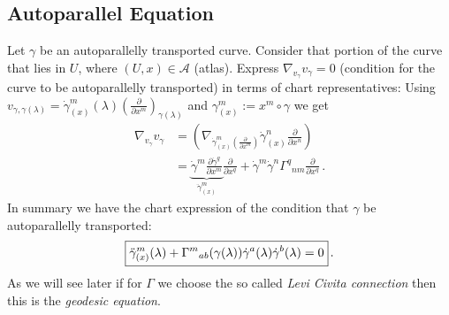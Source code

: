 \documentclass[11pt, a4paper, twocolumn]{article} %
\begin{document}
\subsection{Autoparallel Equation} 
Let $\gamma$ be an autoparallelly transported curve.
Consider that portion of the curve that lies in $U$, where $(U,x)\in \mathcal{A}$ (atlas).
Express $\nabla_{v_\gamma}v_\gamma = 0$ (condition for the curve to be autoparallelly transported)
in terms of chart representatives:
Using $v_{\gamma, \gamma(\lambda)} = \dot{\gamma}^m_{(x)}(\lambda) \left( \frac{\partial}{\partial x^m} \right)_{\gamma(\lambda)}$
and $\gamma^m_{(x)} := x^m \circ \gamma$ we get
\begin{align}
    \nonumber \nabla_{v_\gamma}v_\gamma  &= \left( \nabla_{\dot{\gamma}^m_{(x)} \left( \frac{\partial}{\partial x^m} \right)} \dot{\gamma}^n_{(x)}  \frac{\partial}{\partial x^n}  \right)\\
    &= \underbrace{\dot{\gamma}^m \frac{\partial \dot{\gamma}^q}{\partial x^m}}_{\ddot{\gamma}^m_{(x)}} \frac{\partial}{\partial x^q} + \dot{\gamma}^m \dot{\gamma}^n \Gamma^q{}_{nm}\frac{\partial}{\partial x^q}\,.
    \label{eq:autoparallelEquation}
\end{align}
In summary we have the chart expression of the condition that $\gamma$ be autoparallelly transported:
\begin{equation}
    \boxed{%
    \ddot{\gamma}^{m}_{(x)}(\lambda) + \Gamma^m{}_{ab}(\gamma(\lambda)) \dot{\gamma}^a(\lambda)\dot{\gamma}^b(\lambda) = 0}\,.
\end{equation}
As we will see later if for $\Gamma$ we choose the so called \textit{Levi Civita connection}
then this is the \textit{geodesic equation}.
\end{document}

